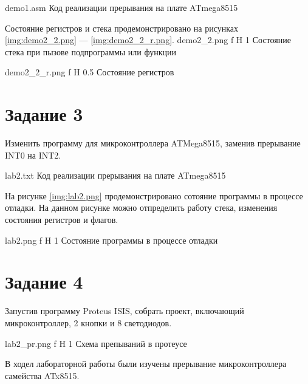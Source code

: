 \documentclass{bmstu}
\makeatletter
\renewcommand\chapter{\par%
\thispagestyle{plain}%
\@afterindentfalse \secdef\@chapter\@schapter}
\makeatother
\begin{document}
	{demo1.asm}
	{Код реализации прерывания на плате ATmega8515}

Состояние регистров и стека продемонстрировано на рисунках \ref{img:demo2_2.png} --- \ref{img:demo2_2_r.png}.
    {demo2_2.png} %
    {f} %
    {H} %
    {1\textwidth} %
    {Состояние стека при пызове подпрограммы или функции} 

    {demo2_2_r.png} %
    {f} %
    {H} %
    {0.5\textwidth} %
    {Состояние регистров} 

\section{Задание 3}
Изменить программу для микроконтроллера ATMega8515, заменив прерывание INT0 на INT2.

	{lab2.txt}
	{Код реализации прерывания на плате ATmega8515}

На рисунке \ref{img:lab2.png} продемонстрировано сотояние программы в процессе отладки. На данном рисунке можно отпределить работу стека, изменения состояния регистров и флагов.

    {lab2.png} %
    {f} %
    {H} %
    {1\textwidth} %
    {Состояние программы в процессе отладки} 

\newpage
\section{Задание 4}
Запустив программу Proteus ISIS, собрать проект, включающий микроконтроллер, 2 кнопки и 8 светодиодов.

    {lab2_pr.png} %
    {f} %
    {H} %
    {1\textwidth} %
    {Схема препываний в протеусе} %

\chapter{Вывод:}
В ходел лабораторной работы были изучены прерывание микроконтроллера самейства ATx8515.
\end{document}
